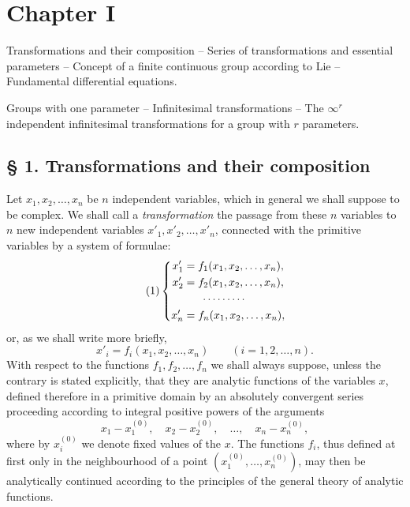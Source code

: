 \documentclass[11pt]{book}
\begin{document}
\mainmatter
\chapter*{Chapter I}

\begin{center}
\begin{minipage}{0.88\linewidth}
\centering
Transformations and their composition -- Series of transformations and essential parameters -- Concept of a finite continuous group according to Lie -- Fundamental differential equations.\par
Groups with one parameter -- Infinitesimal transformations -- The $\infty^r$ independent infinitesimal transformations for a group with $r$ parameters.
\end{minipage}
\end{center}

\section*{\S{} 1. Transformations and their composition}

Let $x_1,x_2,\ldots,x_n$ be $n$ independent variables, which in general we shall suppose to be complex. We shall call a \emph{transformation} the passage from these $n$ variables to $n$ new independent variables $x'_1,x'_2,\ldots,x'_n$, connected with the primitive variables by a system of formulae:
\begin{equation*}\tag{1}
\left\{
\begin{aligned}
 x'_1&=f_1(x_1,x_2,\ldots,x_n),\\
 x'_2&=f_2(x_1,x_2,\ldots,x_n),\\
 &\hspace{1.6em}\cdots\cdots\cdots\\
 x'_n&=f_n(x_1,x_2,\ldots,x_n),
\end{aligned}
\right.
\end{equation*}
or, as we shall write more briefly,
\begin{equation*}\tag{$1^*$}
 x'_i=f_i(x_1,x_2,\ldots,x_n)\qquad (i=1,2,\ldots,n).
\end{equation*}
With respect to the functions $f_1,f_2,\ldots,f_n$ we shall always suppose, unless the contrary is stated explicitly, that they are analytic functions of the variables $x$, defined therefore in a primitive domain by an absolutely convergent series proceeding according to integral positive powers of the arguments
\[
 x_1-x_1^{(0)},\quad x_2-x_2^{(0)},\quad \ldots,\quad x_n-x_n^{(0)},
\]
where by $x_i^{(0)}$ we denote fixed values of the $x$. The functions $f_i$, thus defined at first only in the neighbourhood of a point $(x_1^{(0)},\ldots,x_n^{(0)})$, may then be analytically continued according to the principles of the general theory of analytic functions.
\end{document}
